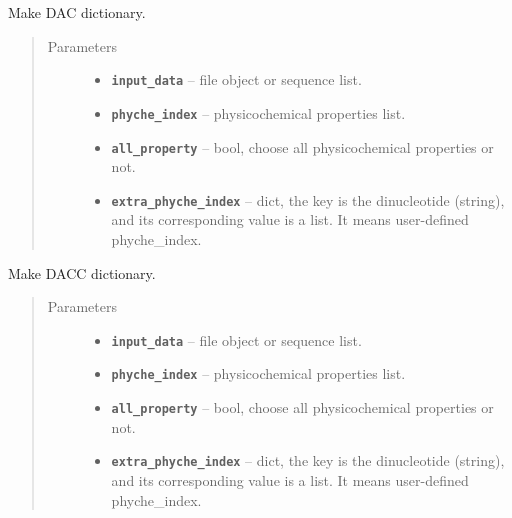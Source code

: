 \documentclass[letterpaper,10pt,english]{sphinxmanual}
\begin{document}
\begin{fulllineitems}
\label{reference/PyDNAac:PyDNAac.GetDAC}
Make DAC dictionary.
\begin{quote}\begin{description}
\item[{Parameters}] \leavevmode\begin{itemize}
\item {} 
\textbf{\texttt{input\_data}} -- file object or sequence list.

\item {} 
\textbf{\texttt{phyche\_index}} -- physicochemical properties list.

\item {} 
\textbf{\texttt{all\_property}} -- bool, choose all physicochemical properties or not.

\item {} 
\textbf{\texttt{extra\_phyche\_index}} -- dict, the key is the dinucleotide (string), and its corresponding value is a list.
It means user-defined phyche\_index.

\end{itemize}

\end{description}\end{quote}

\end{fulllineitems}


\begin{fulllineitems}
\label{reference/PyDNAac:PyDNAac.GetDACC}
Make DACC dictionary.
\begin{quote}\begin{description}
\item[{Parameters}] \leavevmode\begin{itemize}
\item {} 
\textbf{\texttt{input\_data}} -- file object or sequence list.

\item {} 
\textbf{\texttt{phyche\_index}} -- physicochemical properties list.

\item {} 
\textbf{\texttt{all\_property}} -- bool, choose all physicochemical properties or not.

\item {} 
\textbf{\texttt{extra\_phyche\_index}} -- dict, the key is the dinucleotide (string), and its corresponding value is a list.
It means user-defined phyche\_index.

\end{itemize}

\end{description}\end{quote}

\end{fulllineitems}
\end{document}
